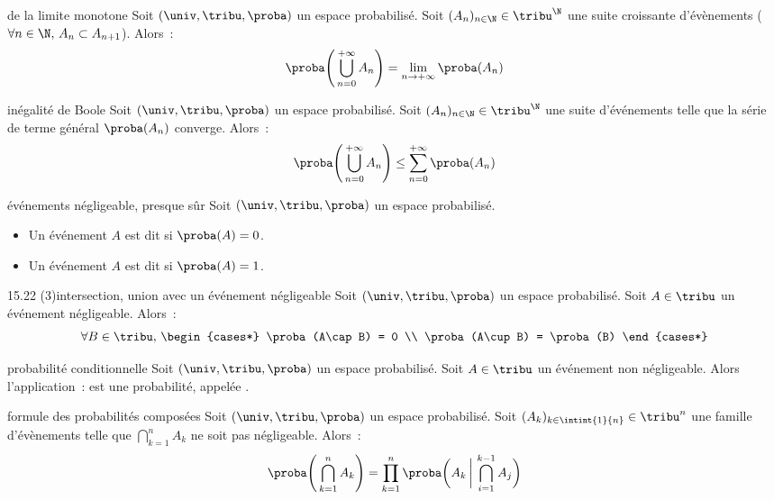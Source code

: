 \begin{adjustwidth}{-3cm}{-3cm}
\begin{theoreme}{15.17}{de la limite monotone}
    Soit $(\univ, \tribu, \proba)$ un espace probabilisé. Soit $(A_n)_{n\in \N} \in \tribu^\N$ une suite croissante d'évènements ($\forall n \in \N,\, A_n \subset A_{n+1}$). Alors~:
    $$\proba\Bigg(\bigcup_{n=0}^{+\infty}A_n\Bigg) = \lim_{n \to +\infty} \proba(A_n)$$
\end{theoreme}

\begin{proposition}{15.20}{inégalité de Boole}
    Soit $(\univ, \tribu, \proba)$ un espace probabilisé. Soit $(A_n)_{n\in \N} \in \tribu^\N$ une suite d'événements telle que la série de terme général $\proba(A_n)$ converge. Alors~:
    $$\proba\Bigg(\bigcup_{n=0}^{+\infty}A_n\Bigg) \leq \sum_{n=0}^{+\infty} \proba(A_n)$$
\end{proposition}

\begin{definition}{15.21}{événements négligeable, presque sûr}
    Soit $(\univ, \tribu, \proba)$ un espace probabilisé.
    \begin{itemize}
        \item Un événement $A$ est dit  si $\proba(A) = 0$.
        \item Un événement $A$ est dit  si $\proba(A) = 1$.
    \end{itemize}
\end{definition}

\begin{proposition}{15.22 (3)}{intersection, union avec un événement négligeable}
    Soit $(\univ, \tribu, \proba)$ un espace probabilisé. Soit $A \in \tribu$ un événement négligeable. Alors~:
    $$\forall B \in \tribu,\, \begin{cases*}
        \proba(A\cap B) = 0 \\ \proba(A\cup B) = \proba(B)
    \end{cases*} $$
\end{proposition}

\begin{definition}{15.24}{probabilité conditionnelle}
    Soit $(\univ, \tribu, \proba)$ un espace probabilisé. Soit $A \in \tribu$ un événement non négligeable. Alors l'application~:
    est une probabilité, appelée .
\end{definition}

\begin{theoreme}{15.26}{formule des probabilités composées}
    Soit $(\univ, \tribu, \proba)$ un espace probabilisé. Soit $(A_k)_{k \in \intint{1}{n}} \in \tribu^n$ une famille d'évènements telle que $\displaystyle \bigcap_{k=1}^{n}A_k$ ne soit pas négligeable. Alors~:
    $$\proba\Bigg(\bigcap_{k=1}^nA_k\Bigg) = \prod_{k=1}^n\proba\bigg( A_k\, \bigg\vert\,\bigcap_{i=1}^{k-1} A_j \bigg)$$
\end{theoreme}


\end{adjustwidth}
